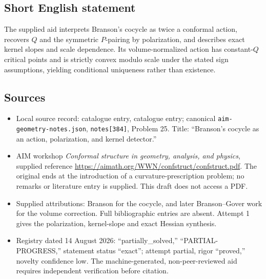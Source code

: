 \documentclass[11pt]{article}
\begin{document}
\subsection{Short English statement}
The supplied aid interprets Branson's cocycle as twice a conformal action, recovers \(Q\) and the symmetric \(P\)-pairing by polarization, and describes exact kernel slopes and scale dependence. Its volume-normalized action has constant-\(Q\) critical points and is strictly convex modulo scale under the stated sign assumptions, yielding conditional uniqueness rather than existence.
\subsection{Sources}
\begin{itemize}
\item Local source record: catalogue entry, catalogue entry; canonical \texttt{aim-geometry-notes.json}, \texttt{notes[384]}, Problem 25. Title: ``Branson's cocycle as an action, polarization, and kernel detector.''
\item AIM workshop \emph{Conformal structure in geometry, analysis, and physics}, supplied reference \url{https://aimath.org/WWN/confstruct/confstruct.pdf}. The original ends at the introduction of a curvature-prescription problem; no remarks or literature entry is supplied. This draft does not access a PDF.
\item Supplied attributions: Branson for the cocycle, and later Branson--Gover work for the volume correction. Full bibliographic entries are absent. Attempt 1 gives the polarization, kernel-slope and exact Hessian synthesis.
\item Registry dated 14 August 2026: ``partially\_solved,'' ``PARTIAL-PROGRESS,'' statement status ``exact''; attempt partial, rigor ``proved,'' novelty confidence low. The machine-generated, non-peer-reviewed aid requires independent verification before citation.
\end{itemize}
\end{document}
